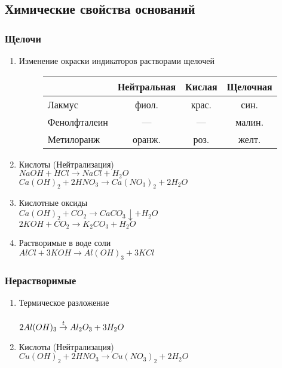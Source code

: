 \subsection{Химические свойства оснований}
\subsubsection{Щелочи}
\begin{enumerate}
    \item Изменение окраски индикаторов растворами щелочей
        \begin{figure*}[h!]
            \begin{tabular}[b]{| l | c | c | c |}
                \hline
                      & Нейтральная & Кислая & Щелочная \\
                \hline
                Лакмус & фиол. & крас. & син. \\
                \hline
                Фенолфталеин & --- & --- & малин. \\
                \hline
                Метилоранж & оранж. & роз. & желт. \\
                \hline
            \end{tabular}
        \end{figure*}

    \item Кислоты (Нейтрализация)\\
        $NaOH + HCl \rightarrow NaCl + H_2O$\\
        $Ca(OH)_2 + 2HNO_3 \rightarrow Ca(NO_3)_2 + 2H_2O$

    \item Кислотные оксиды\\
        $Ca(OH)_2 + CO_2 \rightarrow CaCO_3\downarrow + H_2O$\\
        $2KOH + CO_2 \rightarrow K_2CO_3 + H_2O$

    \item Растворимые в воде соли\\
        $AlCl + 3KOH \rightarrow Al(OH)_3 + 3KCl$

\end{enumerate}


\subsubsection{Нерастворимые}
\begin{enumerate}
    \item Термическое разложение\\
        \\
        $2Al(OH)_3 \stackrel{t}{\rightarrow} Al_2O_3 + 3H_2O$

    \item Кислоты (Нейтрализация)\\
        $Cu(OH)_2 + 2HNO_3 \rightarrow Cu(NO_3)_2 + 2H_2O$
\end{enumerate}
